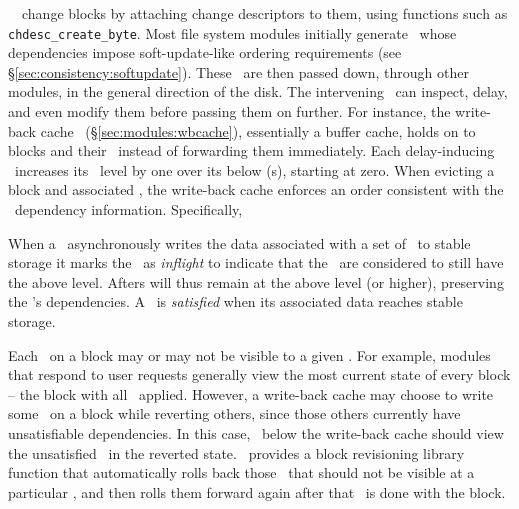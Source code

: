 \Kudos\ \modules\ change blocks by attaching change descriptors to them,
using functions such as \texttt{chdesc\_create\_byte}.
%
Most file system modules initially generate \chdescs\ whose
dependencies impose soft-update-like ordering requirements (see
\S\ref{sec:consistency:softupdate}).  These \chdescs\ are then passed down,
through other modules, in the general direction of the disk.  The
intervening \modules\ can
inspect, delay, and even modify them before passing them on further. For
instance, the write-back cache \module\ (\S\ref{sec:modules:wbcache}),
essentially a buffer cache, holds
on to blocks and their \chdescs\ instead of forwarding them
immediately. Each delay-inducing \module\ increases its \module\
level by one over its below \module{}(s), starting at zero.
%
When evicting a block and associated \chdescs, the write-back
cache enforces an order consistent with the \chdesc\ dependency
information. Specifically,

When a \module\ asynchronously writes the data associated with a set
of \chdescs\ to stable storage it marks the \chdescs\ as
\emph{inflight} to indicate that the \chdescs\ are considered to still
have the above level. Afters will thus remain at the above level (or
higher), preserving the \chdescs{}'s dependencies.
%
A \chdesc\ is \emph{satisfied} when its associated data reaches stable
storage.

Each \chdesc\ on a block may or may not be visible to a given \module.
%
For example, modules that respond to user requests generally view the most
 current state of every block -- the block with all \chdescs\ applied.
%
However, a write-back cache may choose to write some \chdescs\ on a block
 while reverting others, since those others currently have unsatisfiable
 dependencies.
%
In this case, \modules\ below the write-back cache should view the
 unsatisfied \chdescs\ in the reverted state.
%
%
\Kudos\ provides a block revisioning library function that automatically rolls back those
 \chdescs\ that should not be visible at a particular \module, and then
 rolls them forward again after that \module\ is done with the block.


